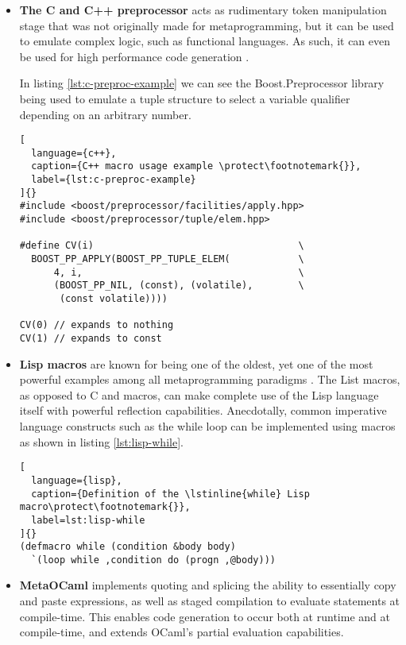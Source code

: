 \documentclass[../main]{subfiles}
\begin{document}
\begin{itemize}

\item
\textbf{The C and C++ preprocessor} acts as rudimentary token manipulation stage
that was not originally made for metaprogramming, but it can be used
to emulate complex logic, such as functional languages. As such, it can even
be used for high performance code generation \cite{6662183}.

In listing \ref{lst:c-preproc-example} we can see the Boost.Preprocessor library
being used to emulate a tuple structure to select a variable qualifier depending
on an arbitrary number.

\begin{lstlisting}[
  language={c++},
  caption={C++ macro usage example \protect\footnotemark{}},
  label={lst:c-preproc-example}
]{}
#include <boost/preprocessor/facilities/apply.hpp>
#include <boost/preprocessor/tuple/elem.hpp>

#define CV(i)                                    \
  BOOST_PP_APPLY(BOOST_PP_TUPLE_ELEM(            \
      4, i,                                      \
      (BOOST_PP_NIL, (const), (volatile),        \
       (const volatile))))

CV(0) // expands to nothing
CV(1) // expands to const
\end{lstlisting}

\item
\textbf{Lisp macros}
are known for being one of the oldest, yet one of the most powerful
examples among all metaprogramming paradigms \cite{metaprog-lang-survey}.
The List macros, as opposed to C and \cpp macros, can make complete use of
the Lisp language itself with powerful reflection capabilities.
Anecdotally, common imperative language constructs such as the while loop
can be implemented using macros as shown in listing \ref{lst:lisp-while}.

\begin{lstlisting}[
  language={lisp},
  caption={Definition of the \lstinline{while} Lisp macro\protect\footnotemark{}},
  label=lst:lisp-while
]{}
(defmacro while (condition &body body)
  `(loop while ,condition do (progn ,@body)))
\end{lstlisting}

\item
\textbf{MetaOCaml} \cite{metaocaml} implements quoting and splicing
\ie the ability to essentially copy and paste expressions,
as well as staged compilation to evaluate statements at compile-time.
This enables code generation to occur both at runtime and at compile-time,
and extends OCaml's partial evaluation capabilities.


\end{itemize}
\end{document}
